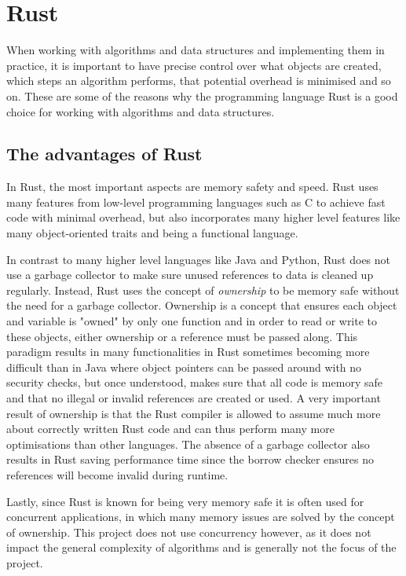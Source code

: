 \chapter{Rust}

When working with algorithms and data structures and implementing them in practice, it is important to have precise control over what objects are created, which steps an algorithm performs, that potential overhead is minimised and so on. These are some of the reasons why the programming language Rust is a good choice for working with algorithms and data structures. 

\section{The advantages of Rust}

In Rust, the most important aspects are memory safety and speed. Rust uses many features from low-level programming languages such as C to achieve fast code with minimal overhead, but also incorporates many higher level features like many object-oriented traits and being a functional language\cite{Rust}. 

In contrast to many higher level languages like Java and Python, Rust does not use a garbage collector to make sure unused references to data is cleaned up regularly. Instead, Rust uses the concept of \textit{ownership} to be memory safe without the need for a garbage collector\cite{Rust}. Ownership is a concept that ensures each object and variable is "owned" by only one function and in order to read or write to these objects, either ownership or a reference must be passed along. This paradigm results in many functionalities in Rust sometimes becoming more difficult than in Java where object pointers can be passed around with no security checks, but once understood, makes sure that all code is memory safe and that no illegal or invalid references are created or used. A very important result of ownership is that the Rust compiler is allowed to assume much more about correctly written Rust code and can thus perform many more optimisations than other languages. The absence of a garbage collector also results in Rust saving performance time since the borrow checker ensures no references will become invalid during runtime\cite{Rust}. 

Lastly, since Rust is known for being very memory safe it is often used for concurrent applications, in which many memory issues are solved by the concept of ownership. This project does not use concurrency however, as it does not impact the general complexity of algorithms and is generally not the focus of the project. 

